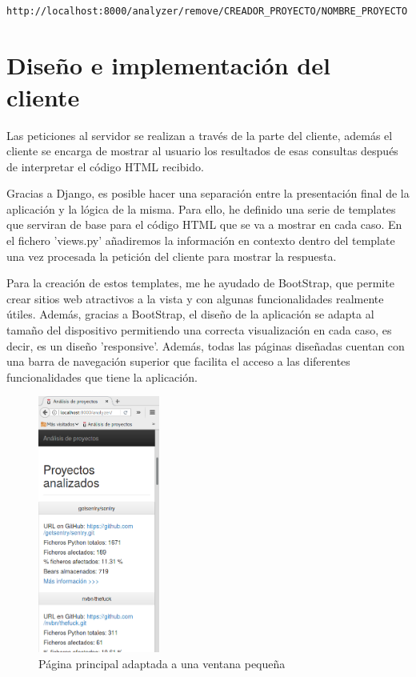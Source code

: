\documentclass[a4paper, 12pt]{book}
\begin{document}
{\footnotesize
\begin{verbatim}
    http://localhost:8000/analyzer/remove/CREADOR_PROYECTO/NOMBRE_PROYECTO
\end{verbatim}
}

\section{Diseño e implementación del cliente} 
\label{sec:seccion13}
Las peticiones al servidor se realizan a través de la parte del cliente, además el cliente se encarga de mostrar al usuario los resultados de esas consultas después de interpretar el código HTML recibido.

Gracias a Django, es posible hacer una separación entre la presentación final de la aplicación y la lógica de la misma. Para ello, he definido una serie de templates que serviran de base para el código HTML que se va a mostrar en cada caso. En el fichero 'views.py' añadiremos la información en contexto dentro del template una vez procesada la petición del cliente para mostrar la respuesta.

Para la creación de estos templates, me he ayudado de BootStrap, que permite crear sitios web atractivos a la vista y con algunas funcionalidades realmente útiles. Además, gracias a BootStrap, el diseño de la aplicación se adapta al tamaño del dispositivo permitiendo una correcta visualización en cada caso, es decir, es un diseño 'responsive'. Además, todas las páginas diseñadas cuentan con una barra de navegación superior que facilita el acceso a las diferentes funcionalidades que tiene la aplicación.

\begin{figure}[h]
  \centering
  \includegraphics[width=4cm, keepaspectratio]{img/webAdaptativa}
  \caption{Página principal adaptada a una ventana pequeña}
  \label{fig:webAdaptativa}
\end{figure}
\end{document}
